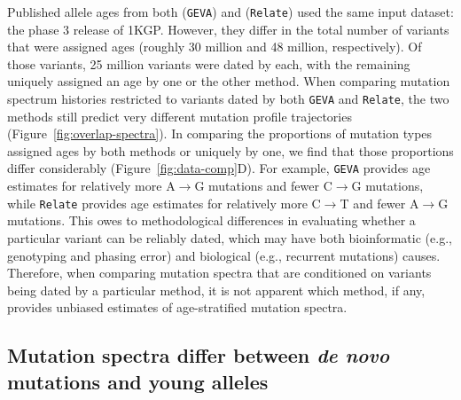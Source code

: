 \documentclass[]{article}
\newcommand{\GEVA}{\texttt{GEVA}\xspace}
\newcommand{\relate}{\texttt{Relate}\xspace}
\begin{document}
Published allele ages from both \citet{albers2020dating} (\GEVA) and
\citet{speidel2019method} (\relate) used the same input dataset: the phase 3
release of 1KGP. However, they differ in the total number of variants that were
assigned ages (roughly 30 million and 48 million, respectively). Of those
variants, 25 million variants were dated by each, with the remaining uniquely
assigned an age by one or the other method. When comparing mutation spectrum
histories restricted to variants dated by both \GEVA and \relate, the two
methods still predict very different mutation profile trajectories
(Figure~\ref{fig:overlap-spectra}). In comparing the proportions of mutation
types assigned ages by both methods or uniquely by one, we find that those
proportions differ considerably (Figure~\ref{fig:data-comp}D). For example,
\GEVA provides age estimates for relatively more A$\rightarrow$G mutations and
fewer C$\rightarrow$G mutations, while \relate provides age estimates for
relatively more C$\rightarrow$T and fewer A$\rightarrow$G mutations. This owes
to methodological differences in evaluating whether a particular variant can be
reliably dated, which may have both bioinformatic (e.g., genotyping and phasing
error) and biological (e.g., recurrent mutations) causes. Therefore, when
comparing mutation spectra that are conditioned on variants being dated by a
particular method, it is not apparent which method, if any, provides unbiased
estimates of age-stratified mutation spectra.

\subsection*{Mutation spectra differ between \emph{de novo} mutations and young
alleles}
\end{document}
